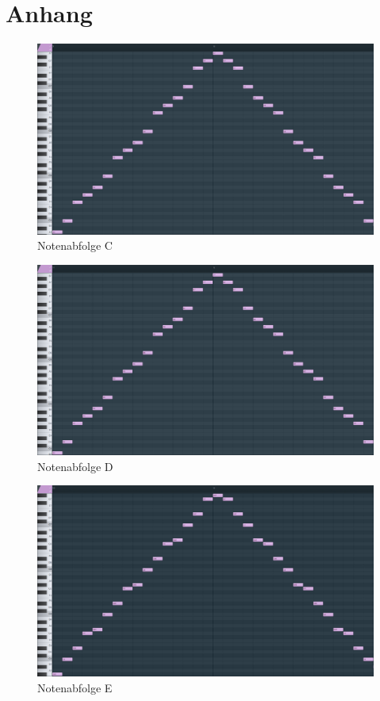 \section{Anhang}

\begin{figure}[htbp] \centering
	\includegraphics[width=.95\linewidth]{images/Noten_C.png}
	\caption{Notenabfolge C}
	\label{NotenabfolgeC}
\end{figure}

\begin{figure}[htbp] \centering
	\includegraphics[width=.95\linewidth]{images/Noten_D.png}
	\caption{Notenabfolge D}
	\label{NotenabfolgeD}
\end{figure}

\begin{figure}[htbp] \centering
	\includegraphics[width=.95\linewidth]{images/Noten_E.png}
	\caption{Notenabfolge E}
	\label{NotenabfolgeE}
\end{figure}

